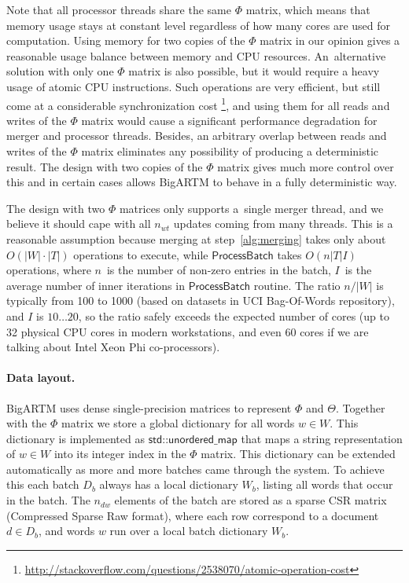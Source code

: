 \documentclass[russian]{llncs}
\newcommand{\kw}[1]{\textsf{#1}}
\begin{document}
Note that all processor threads share the same $\Phi$ matrix,
which means that memory usage stays at constant level regardless of how many cores are used for computation.
Using memory for two copies of the $\Phi$ matrix in our opinion gives a reasonable usage balance between memory and CPU resources.
An~alternative solution with only one $\Phi$ matrix is also possible, but it would require a heavy usage of atomic CPU instructions.
Such operations are very efficient, but still come at a considerable synchronization cost%
\footnote{\url{http://stackoverflow.com/questions/2538070/atomic-operation-cost}},
and using them for all reads and writes of the $\Phi$ matrix would cause a significant performance degradation for merger and processor threads.
Besides, an arbitrary overlap between reads and writes of the $\Phi$ matrix eliminates any possibility of producing a deterministic result.
The design with two copies of the $\Phi$ matrix gives much more control over this
and in certain cases allows BigARTM to behave in a fully deterministic way.

The design with two $\Phi$ matrices only supports a~single merger thread,
and we believe it should cape with all $n_{wt}$ updates coming from many threads.
This is a reasonable assumption because
merging at step~\ref{alg:merging} takes only about $O(|W|\cdot|T|)$ operations to execute, while
$\kw{ProcessBatch}$ takes $O(n |T| I)$ operations,
where
$n$~is the number of non-zero entries in the batch,
$I$~is the average number of inner iterations in $\kw{ProcessBatch}$ routine.
The ratio $n / |W|$ is typically from 100 to 1000 (based on datasets in UCI Bag-Of-Words repository),
and $I$ is $10 \dots 20$, so the ratio safely exceeds the expected number of cores
(up to 32 physical CPU cores in modern workstations, and even 60 cores if we are talking about Intel Xeon Phi co-processors).

\paragraph{Data layout.}
BigARTM uses dense single-precision matrices to represent $\Phi$ and $\Theta$.
Together with the $\Phi$ matrix we store a global dictionary for all words $w \in W$.
This dictionary is implemented as $\kw{std::unordered\_map}$ that maps a string representation of $w \in W$
into its integer index in the $\Phi$ matrix.
This dictionary can be extended automatically as more and more batches came through the system.
To achieve this each batch $D_b$ always has a local dictionary $W_b$, listing all words that occur in the batch.
The $n_{dw}$ elements of the batch are stored as a sparse CSR matrix (Compressed Sparse Raw format),
where each row correspond to a document $d \in D_b$, and words $w$ run over a local batch dictionary $W_b$.
\end{document}
